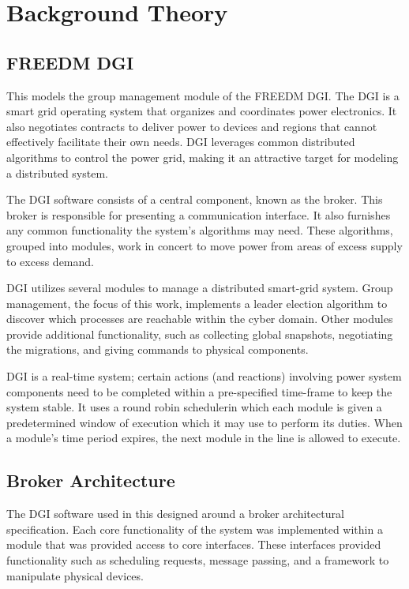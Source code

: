 \chapter{Background Theory}

\section{FREEDM DGI}
This models the group management module of the FREEDM DGI.
The DGI is a smart grid operating system that organizes and coordinates power electronics.
It also negotiates contracts to deliver power to devices and regions that cannot effectively facilitate their own needs.
DGI leverages common distributed algorithms to control the power grid, making it an attractive target for modeling a distributed system.

The DGI software consists of a central component, known as the broker.
This broker is responsible for presenting a communication interface.
It also furnishes any common functionality the system's algorithms may need.
These algorithms, grouped into modules, work in concert to move power from areas of excess supply to excess demand.

DGI utilizes several modules to manage a distributed smart-grid system.
Group management, the focus of this work, implements a leader election algorithm to discover which processes are reachable within the cyber domain.
Other modules provide additional functionality, such as collecting global snapshots, negotiating the migrations, and giving commands to physical components.

DGI is a real-time system; certain actions (and reactions) involving power system components need to be completed within a pre-specified time-frame to keep the system stable.
It uses a round robin schedulerin which each module is given a predetermined window of execution which it may use to perform its duties.
When a module's time period expires, the next module in the line is allowed to execute. 

\section{Broker Architecture}

The DGI software used in this designed around a broker architectural specification.
Each core functionality of the system was implemented within a module that was provided access to core interfaces.
These interfaces provided functionality such as scheduling requests, message passing, and a framework to manipulate physical devices.


